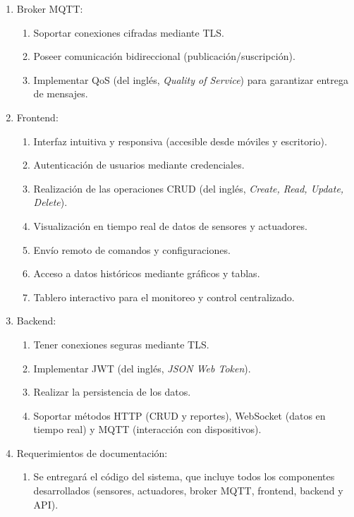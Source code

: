 \begin{enumerate}
      \item Broker MQTT:
            \begin{enumerate}
                  \item Soportar conexiones cifradas mediante TLS.
                  \item Poseer comunicación bidireccional (publicación/suscripción).
                  \item Implementar QoS (del inglés, \textit{Quality of Service}) para garantizar
                        entrega de mensajes.
            \end{enumerate}

      \item Frontend:
            \begin{enumerate}
                  \item Interfaz intuitiva y responsiva (accesible desde móviles y escritorio).
                  \item Autenticación de usuarios mediante credenciales.
                  \item Realización de las operaciones CRUD (del inglés, \textit{Create, Read, Update,
                              Delete}).
                  \item Visualización en tiempo real de datos de sensores y actuadores.
                  \item Envío remoto de comandos y configuraciones.
                  \item Acceso a datos históricos mediante gráficos y tablas.
                  \item Tablero interactivo para el monitoreo y control centralizado.
            \end{enumerate}

      \item Backend:
            \begin{enumerate}
                  \item Tener conexiones seguras mediante TLS.
                  \item Implementar JWT (del inglés, \textit{JSON Web Token}).
                  \item Realizar la persistencia de los datos.
                  \item Soportar métodos HTTP (CRUD y reportes), WebSocket (datos en tiempo real) y
                        MQTT (interacción con dispositivos).
            \end{enumerate}

      \item Requerimientos de documentación:
            \begin{enumerate}
                  \item Se entregará el código del sistema, que incluye todos los componentes
                        desarrollados (sensores, actuadores, broker MQTT, frontend, backend y API).
            \end{enumerate}
\end{enumerate}

